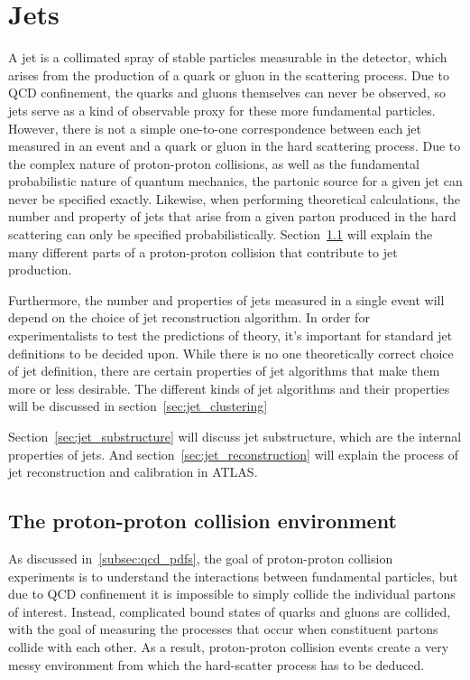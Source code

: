\chapter{Jets} \label{ch:jets}

A jet is a collimated spray of stable particles measurable in the detector,
which arises from the production of a quark or gluon in the scattering process.
Due to QCD confinement, the quarks and gluons themselves can never be observed,
so jets serve as a kind of observable proxy for these more fundamental particles.
However, there is not a simple one-to-one correspondence between each jet measured in an event and a quark or gluon in the hard scattering process.
Due to the complex nature of proton-proton collisions, as well as the fundamental probabilistic nature of quantum mechanics,
the partonic source for a given jet can never be specified exactly.
Likewise, when performing theoretical calculations, the number and property of jets that arise from a given parton produced in the hard scattering
can only be specified probabilistically.
Section~\ref{sec:jet_collisions} will explain the many different parts of a proton-proton collision that contribute to jet production.

Furthermore, the number and properties of jets measured in a single event will depend on the choice of jet reconstruction algorithm.
In order for experimentalists to test the predictions of theory, it's important for standard jet definitions to be decided upon.
While there is no one theoretically correct choice of jet definition, there are certain properties of jet algorithms
that make them more or less desirable.
The different kinds of jet algorithms and their properties will be discussed in section~\ref{sec:jet_clustering}

Section~\ref{sec:jet_substructure} will discuss jet substructure, which are the internal properties of jets.
And section~\ref{sec:jet_reconstruction} will explain the process of jet reconstruction and calibration in ATLAS.

\section{The proton-proton collision environment}\label{sec:jet_collisions}

As discussed in~\ref{subsec:qcd_pdfs}, the goal of proton-proton collision experiments is to understand the interactions
between fundamental particles, but due to QCD confinement it is impossible to simply collide the individual partons of interest.
Instead, complicated bound states of quarks and gluons are collided,
with the goal of measuring the processes that occur when constituent partons collide with each other.
As a result, proton-proton collision events create a very messy environment from which the hard-scatter process
has to be deduced.


